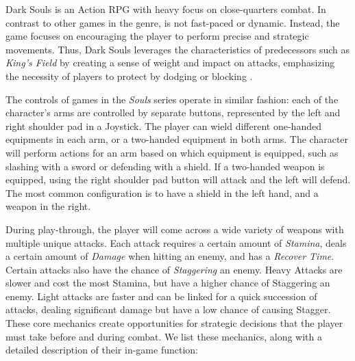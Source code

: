 
Dark Souls is an Action RPG with heavy focus on close-quarters combat. In contrast to other games in the genre, is not fast-paced or dynamic. Instead, the game focuses on encouraging the player to perform precise and strategic movements. Thus, Dark Souls leverages the characteristics of predecessors such as \emph{King's Field} by creating a sense of weight and impact on attacks, emphasizing the necessity of players to protect by dodging or blocking \cite{BOOK_DarkSoulsBeyondTheGrave}.

The controls of games in the \emph{Souls} series operate in similar fashion: each of the character's arms are controlled by separate buttons, represented by the left and right shoulder pad in a Joystick. The player can wield different one-handed equipments in each arm, or a two-handed equipment in both arms. The character will perform actions for an arm based on which equipment is equipped, such as slashing with a sword or defending with a shield. If a two-handed weapon is equipped, using the right shoulder pad button will attack and the left will defend. The most common configuration is to have a shield in the left hand, and a weapon in the right.

During play-through, the player will come across a wide variety of weapons with multiple unique attacks.  Each attack requires a certain amount of \emph{Stamina}, deals a certain amount of \emph{Damage} when hitting an enemy, and has a \emph{Recover Time}. Certain attacks also have the chance of \emph{Staggering} an enemy. Heavy Attacks are slower and cost the most Stamina, but have a higher chance of Staggering an enemy. Light attacks are faster and can be linked for a quick succession of attacks, dealing significant damage but have a low chance of causing Stagger. These core mechanics create opportunities for strategic decisions that the player must take before and during combat. We list these mechanics, along with a detailed description of their in-game function:

